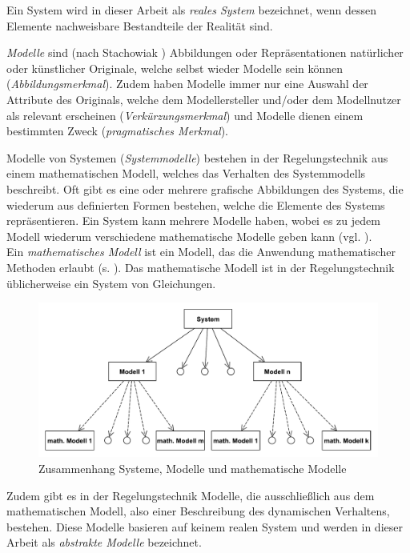 Ein System wird in dieser Arbeit als \textit{reales System} bezeichnet, wenn dessen Elemente nachweisbare Bestandteile der Realität sind.

\textit{Modelle} sind (nach Stachowiak \cite[S. 13ff]{STA73}) Abbildungen oder Repräsentationen natürlicher oder künstlicher Originale, welche selbst wieder Modelle sein können (\textit{Abbildungsmerkmal}). Zudem haben Modelle immer nur eine Auswahl der Attribute des Originals, welche dem Modellersteller und/oder dem Modellnutzer als relevant erscheinen (\textit{Verkürzungsmerkmal}) und Modelle dienen einem bestimmten Zweck (\textit{pragmatisches Merkmal}). 

Modelle von Systemen (\textit{Systemmodelle}) bestehen in der Regelungstechnik aus einem mathematischen Modell, welches das Verhalten des Systemmodells beschreibt. Oft gibt es eine oder mehrere grafische Abbildungen des Systems, die wiederum aus definierten Formen bestehen, welche die Elemente des Systems repräsentieren. Ein System kann mehrere Modelle haben, wobei es zu jedem Modell wiederum verschiedene mathematische Modelle geben kann (vgl. \cite[Abschnitt 2.1]{LUD95}).\\
Ein \textit{mathematisches Modell} ist ein Modell, das die Anwendung mathematischer Methoden erlaubt (s. \cite[S.9]{GRVO16}). Das mathematische Modell ist in der Regelungstechnik üblicherweise ein System von Gleichungen. 

\begin{figure}[H]
	\centering
	\includegraphics[width=0.9\linewidth]{Systeme_Modelle_Math_Beschreibung}
	\caption{Zusammenhang Systeme, Modelle und mathematische Modelle\protect\footnotemark}
	\label{fig:SysModelleSkizze}
\end{figure}

Zudem gibt es in der Regelungstechnik Modelle, die ausschließlich aus dem mathematischen Modell, also einer Beschreibung des dynamischen Verhaltens, bestehen. Diese Modelle basieren auf keinem realen System und werden in dieser Arbeit als \textit{abstrakte Modelle} bezeichnet. %

